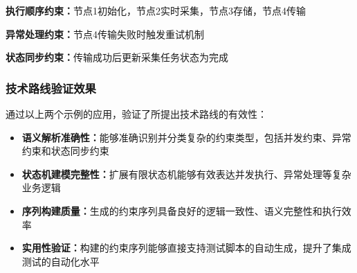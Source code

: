 \documentclass[fontset=windows]{article}
\begin{document}
\textbf{执行顺序约束：}节点1初始化，节点2实时采集，节点3存储，节点4传输

\textbf{异常处理约束：}节点4传输失败时触发重试机制

\textbf{状态同步约束：}传输成功后更新采集任务状态为完成

\subsubsection{技术路线验证效果}
通过以上两个示例的应用，验证了所提出技术路线的有效性：
\begin{itemize}
    \item \textbf{语义解析准确性：}能够准确识别并分类复杂的约束类型，包括并发约束、异常约束和状态同步约束
    \item \textbf{状态机建模完整性：}扩展有限状态机能够有效表达并发执行、异常处理等复杂业务逻辑
    \item \textbf{序列构建质量：}生成的约束序列具备良好的逻辑一致性、语义完整性和执行效率
    \item \textbf{实用性验证：}构建的约束序列能够直接支持测试脚本的自动生成，提升了集成测试的自动化水平
\end{itemize}
\end{document}
